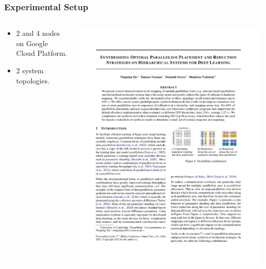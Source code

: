 \documentclass[12pt,aspectratio=169]{beamer}
\begin{document}
    \begin{frame}
        \frametitle{Experimental Setup}

        \begin{columns}
            \begin{column}{0.5\textwidth}
                \begin{itemize}
                    \item 2 and 4 nodes on Google Cloud Platform.
                    \item 2 system topologies.
                \end{itemize}
            \end{column}
            \begin{column}{0.5\textwidth}
                \includegraphics[page=8,trim=1.9cm 18cm 11.4cm 2.2cm,clip,scale=0.8]{p2.pdf}
            \end{column}
        \end{columns}
    \end{frame}
\end{document}
